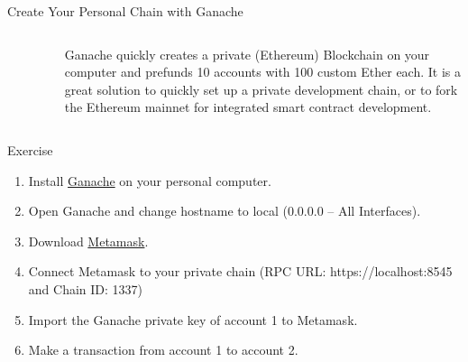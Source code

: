 \documentclass[]{beamer}
\begin{document}
\begin{frame}{Create Your Personal Chain with Ganache}

	\begin{columns}
		\begin{column}{0.15\textwidth}
			\begin{figure}
				\includegraphics[width = \textwidth]{../assets/images/logo_ganache.png}
			\end{figure}
		\end{column}
		\begin{column}{0.85\textwidth}
			Ganache quickly creates a private (Ethereum) Blockchain on your computer and prefunds 10 accounts with 100 custom Ether each. It is a great solution to quickly set up a private development chain, or to fork the Ethereum mainnet for integrated smart contract development.
		\end{column}
	\end{columns}
	\vspace{1em}
	\begin{exercise}{Exercise}
		\begin{enumerate}
			\item Install \href{https://www.trufflesuite.com/ganache}{\link Ganache} on your personal computer.
			\item Open Ganache and change hostname to local (0.0.0.0 -- All Interfaces).
			\item Download \href{https://metamask.io/}{\link Metamask}.
			\item Connect Metamask to your private chain (RPC URL: https://localhost:8545 and Chain ID: 1337)
			\item Import the Ganache private key of account 1 to Metamask.
			\item Make a transaction from account 1 to account 2.
		\end{enumerate}
	\end{exercise}
\end{frame}
\end{document}
